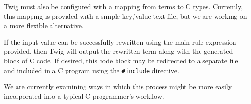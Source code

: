 Twig must also be configured with a mapping from terms to C types. Currently,
this mapping is provided with a simple key/value text file, but we are working
on a more flexible alternative.

If the input value can be successfully rewritten using the main rule
expression provided, then Twig will output the rewritten term along with the
generated block of C code. If desired, this code block may be redirected to a
separate file and included in a C program using the \texttt{\#include}
directive.

We are currently examining ways in which this process might be more easily
incorporated into a typical C programmer's workflow.
